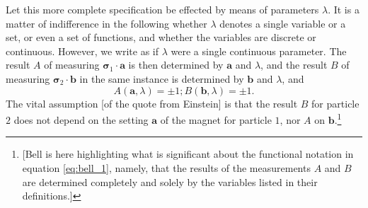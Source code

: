Let this more complete specification be effected by means of parameters $\lambda$. It is a matter of indifference
in the following whether $\lambda$ denotes a single variable or a set, or even a set of functions, and whether
the variables are discrete or continuous. However, we write as if $\lambda$ were a single continuous parameter.
The result $A$ of measuring $\pmb{\sigma}_1 \cdot \pmb{a}$ is then determined by $\pmb{a}$ and $\lambda$, and the result $B$ of measuring 
$\pmb{\sigma}_2 \cdot \pmb{b}$ in the same instance is determined by $\pmb{b}$ and $\lambda$, and
%
\begin{equation}\label{eq:bell_1} %
A(\pmb{a}, \lambda) = \pm1; B(\pmb{b}, \lambda) = \pm 1.
\end{equation}
%
The vital assumption [of the quote from Einstein] is that the result $B$ for particle $2$ does not depend on the setting $\pmb{a}$ of the magnet
for particle $1$, nor $A$ on $\pmb{b}$.\footnote{[Bell is here highlighting what is significant about the functional notation in equation \eqref{eq:bell_1}, namely, that the results of the measurements $A$ and $B$ are determined completely and solely by the variables listed in their definitions.]} 

